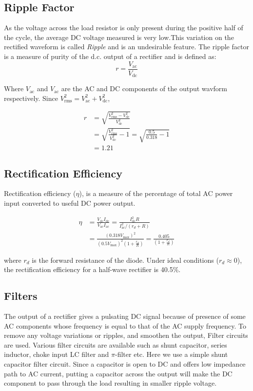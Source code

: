 \subsection{Ripple Factor}
As the voltage across the load resistor is only present during the positive half of the cycle, the average DC voltage measured is very low.This variation on the rectified waveform is called \textit{Ripple} and is an undesirable feature. The ripple factor is a measure of purity of the d.c. output of a rectifier and is defined as:
\newcommand{\at}[2][]{#1|_{#2}}
\begin{equation}
    r = \frac{V_\text{ac}}{V_\text{dc}}
\end{equation}

Where $V_\text{ac}$ and $V_\text{ac}$ are the AC and DC components of the output wavform respectively. Since $V^2_\text{rms} = V^2_\text{ac} + V^2_\text{dc}$,

\begin{align*}
    r &= \sqrt{\frac{V^2_\text{rms} - V^2_\text{dc}}{V^2_\text{dc}}}\\
    &= \sqrt{\frac{V^2_\text{rms}}{V^2_\text{dc}}-1} = \sqrt{\frac{0.5}{0.318}-1}\\ &= 1.21
\end{align*}

\subsection{Rectification Efficiency}
Rectification efficiency ($\eta$), is a measure of the percentage of total AC power input converted to useful DC power output. 

\begin{align*}
    \eta &= \frac{V_\text{dc}I_\text{dc}}{V_\text{ac}I_\text{ac}}
    = \frac{I^2_\text{dc}R}{I^2_\text{ac}/(r_d+R)}\\
    &=\frac{(0.318V_\text{max})^2}{(0.5V_\text{max})^2\left(1+\frac{r_d}{R}\right)} = \frac{0.405}{\left(1+\frac{r_d}{R}\right)}
\end{align*}

where $r_d$ is the forward resistance of the diode. Under ideal conditions ($r_d \approx 0$), the rectification efficiency for a half-wave rectifier is 40.5\%.

\subsection{Filters}
The output of a rectifier gives a pulsating DC signal because of presence of some AC components whose frequency is equal to that of the AC supply frequency. To remove any voltage variations or ripples, and smoothen the output, Filter circuits are used. 
Various filter circuits are available such as shunt capacitor, series inductor, choke input LC filter and $\pi$-filter etc. Here we use a simple shunt capacitor filter circuit. Since a capacitor is open to DC and offers low impedance path to AC current, putting a capacitor across the output will make the DC component to pass through the load resulting in smaller ripple voltage. 

